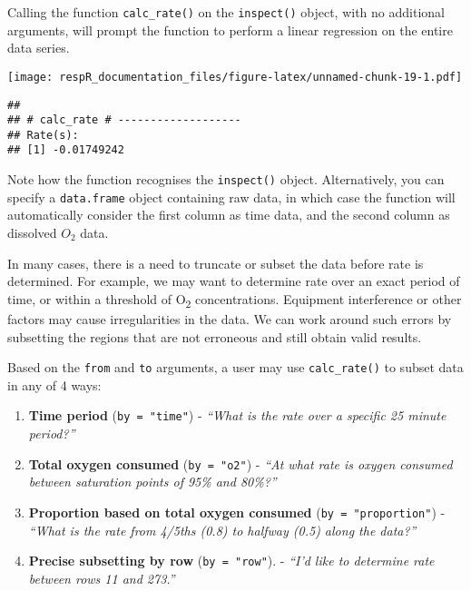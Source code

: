 \documentclass[]{book}
\newenvironment{Shaded}{\begin{snugshade}}{\end{snugshade}}
\newcommand{\KeywordTok}[1]{\textcolor[rgb]{0.13,0.29,0.53}{\textbf{#1}}}
\newcommand{\CommentTok}[1]{\textcolor[rgb]{0.56,0.35,0.01}{\textit{#1}}}
\newcommand{\NormalTok}[1]{#1}
\providecommand{\tightlist}{%
  \setlength{\itemsep}{0pt}\setlength{\parskip}{0pt}}
\begin{document}
Calling the function \texttt{calc\_rate()} on the \texttt{inspect()}
object, with no additional arguments, will prompt the function to
perform a linear regression on the entire data series.

\begin{Shaded}
\end{Shaded}

\texttt{[image: respR\_documentation\_files/figure-latex/unnamed-chunk-19-1.pdf]}

\begin{verbatim}
## 
## # calc_rate # -------------------
## Rate(s):
## [1] -0.01749242
\end{verbatim}

Note how the function recognises the \texttt{inspect()} object.
Alternatively, you can specify a \texttt{data.frame} object containing
raw data, in which case the function will automatically consider the
first column as time data, and the second column as dissolved \(O_2\)
data.

In many cases, there is a need to truncate or subset the data before
rate is determined. For example, we may want to determine rate over an
exact period of time, or within a threshold of O\textsubscript{2}
concentrations. Equipment interference or other factors may cause
irregularities in the data. We can work around such errors by subsetting
the regions that are not erroneous and still obtain valid results.

Based on the \texttt{from} and \texttt{to} arguments, a user may use
\texttt{calc\_rate()} to subset data in any of 4 ways:

\begin{enumerate}
\def\labelenumi{\arabic{enumi}.}
\tightlist
\item
  \textbf{Time period} (\texttt{by\ =\ "time"}) - \emph{``What is the
  rate over a specific 25 minute period?''}
\item
  \textbf{Total oxygen consumed} (\texttt{by\ =\ "o2"}) - \emph{``At
  what rate is oxygen consumed between saturation points of 95\% and
  80\%?''}
\item
  \textbf{Proportion based on total oxygen consumed}
  (\texttt{by\ =\ "proportion"}) - \emph{``What is the rate from 4/5ths
  (0.8) to halfway (0.5) along the data?''}
\item
  \textbf{Precise subsetting by row} (\texttt{by\ =\ "row"}). -
  \emph{``I'd like to determine rate between rows 11 and 273.''}
\end{enumerate}
\end{document}
